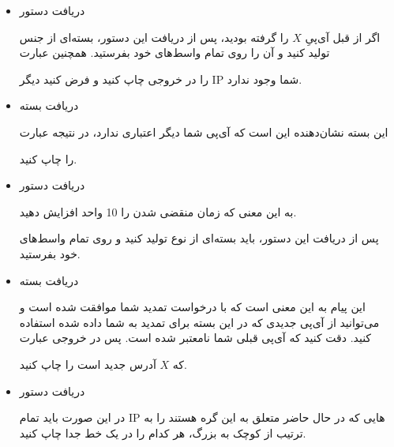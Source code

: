 \begin{itemize}
\item
دریافت دستور 
\begin{flushleft}
\end{flushleft}

اگر از قبل آی‌پیِ $X$ را گرفته بودید، پس از دریافت این دستور، بسته‌ای از جنس
تولید کنید و آن را روی تمام واسط‌های خود بفرستید.
همچنین عبارت
\begin{flushleft}
\end{flushleft}
را در خروجی چاپ کنید و فرض کنید دیگر IP شما وجود ندارد.


\item
دریافت بسته 

این بسته نشان‌دهنده این است که آی‌پی شما دیگر اعتباری ندارد، در نتیجه عبارت
\begin{flushleft}
\end{flushleft}
را چاپ کنید.

\item
دریافت دستور
\begin{flushleft}
\end{flushleft}
 به این معنی که زمان منقضی شدن را 10 واحد افزایش دهید.

پس از دریافت این دستور، باید بسته‌ای از نوع
تولید کنید و روی تمام واسط‌های خود بفرستید.

\item
 دریافت بسته

این پیام به این معنی است که با درخواست تمدید شما موافقت شده است و می‌توانید از آی‌پی جدیدی که در این بسته برای تمدید به شما داده شده استفاده کنید. دقت کنید که آی‌پی قبلی شما نامعتبر شده است. پس در خروجی عبارت
\begin{flushleft}
\end{flushleft}
که $X$ آدرس جدید است را چاپ کنید.

\item
دریافت دستور
\begin{flushleft}
\end{flushleft}

در این صورت باید تمام IP هایی که در حال حاضر متعلق به این گره هستند را به ترتیب از کوچک به بزرگ، هر کدام را در یک خط جدا چاپ کنید.
\end{itemize}
